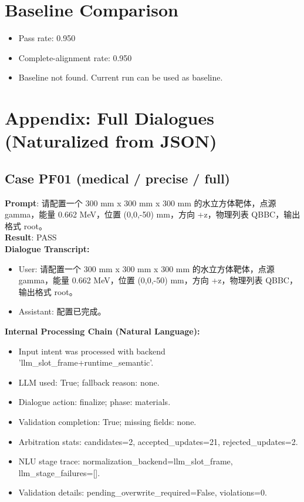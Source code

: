 \documentclass[11pt]{ctexart}
\begin{document}
\section{Baseline Comparison}
\begin{itemize}
\item Pass rate: 0.950
\item Complete-alignment rate: 0.950
\item Baseline not found. Current run can be used as baseline.
\end{itemize}
\appendix
\section{Appendix: Full Dialogues (Naturalized from JSON)}
\subsection{Case PF01 (medical / precise / full)}
\textbf{Prompt}: 请配置一个 300 mm x 300 mm x 300 mm 的水立方体靶体，点源 gamma，能量 0.662 MeV，位置 (0,0,-50) mm，方向 +z，物理列表 QBBC，输出格式 root。\\
\textbf{Result}: PASS\\
\textbf{Dialogue Transcript:}
\begin{itemize}
\item User: 请配置一个 300 mm x 300 mm x 300 mm 的水立方体靶体，点源 gamma，能量 0.662 MeV，位置 (0,0,-50) mm，方向 +z，物理列表 QBBC，输出格式 root。
\item Assistant: 配置已完成。
\end{itemize}
\textbf{Internal Processing Chain (Natural Language):}
\begin{itemize}
\item Input intent was processed with backend 'llm\_slot\_frame+runtime\_semantic'.
\item LLM used: True; fallback reason: none.
\item Dialogue action: finalize; phase: materials.
\item Validation completion: True; missing fields: none.
\item Arbitration stats: candidates=2, accepted\_updates=21, rejected\_updates=2.
\item NLU stage trace: normalization\_backend=llm\_slot\_frame, llm\_stage\_failures=[].
\item Validation details: pending\_overwrite\_required=False, violations=0.
\end{itemize}
\end{document}
